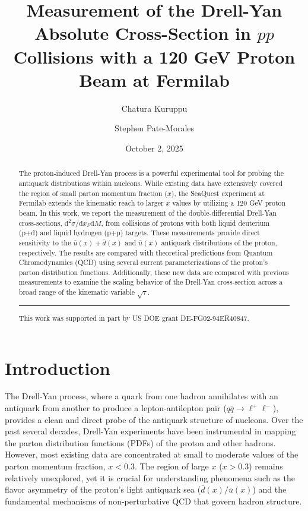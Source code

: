 \documentclass[11pt]{article}
\newcommand{\diffd}{\mathrm{d}}
\begin{document}
\linenumbers
\title{\textbf{Measurement of the Drell-Yan Absolute Cross-Section in $pp$ Collisions with a 120 GeV Proton Beam at Fermilab}}
\author[1]{Chatura Kuruppu}
\author[1]{Stephen Pate-Morales}
\date{October 2, 2025}
\maketitle

\begin{abstract}
The proton-induced Drell-Yan process is a powerful experimental tool for probing the antiquark distributions within nucleons. While existing data have extensively covered the region of small parton momentum fraction ($x$), the SeaQuest experiment at Fermilab extends the kinematic reach to larger $x$ values by utilizing a 120 GeV proton beam. In this work, we report the measurement of the double-differential Drell-Yan cross-sections, $\diffd^{2}\sigma/\diffd x_{F}\diffd M$, from collisions of protons with both liquid deuterium (p+d) and liquid hydrogen (p+p) targets. These measurements provide direct sensitivity to the $\bar{u}(x) + \bar{d}(x)$ and $\bar{u}(x)$ antiquark distributions of the proton, respectively. The results are compared with theoretical predictions from Quantum Chromodynamics (QCD) using several current parameterizations of the proton's parton distribution functions. Additionally, these new data are compared with previous measurements to examine the scaling behavior of the Drell-Yan cross-section across a broad range of the kinematic variable $\sqrt{\tau}$.
\vspace{1em}
\hrule
\vspace{1em}
\footnotesize{This work was supported in part by US DOE grant DE-FG02-94ER40847.}
\end{abstract}

\clearpage

\tableofcontents
\clearpage
\listoffigures
\clearpage
\listoftables
\clearpage


\section{Introduction}
\label{sec:introduction}
The Drell-Yan process, where a quark from one hadron annihilates with an antiquark from another to produce a lepton-antilepton pair ($q\bar{q} \rightarrow \ell^+\ell^-$), provides a clean and direct probe of the antiquark structure of nucleons. Over the past several decades, Drell-Yan experiments have been instrumental in mapping the parton distribution functions (PDFs) of the proton and other hadrons. However, most existing data are concentrated at small to moderate values of the parton momentum fraction, $x < 0.3$. The region of large $x$ ($x>0.3$) remains relatively unexplored, yet it is crucial for understanding phenomena such as the flavor asymmetry of the proton's light antiquark sea ($\bar{d}(x)/\bar{u}(x)$) and the fundamental mechanisms of non-perturbative QCD that govern hadron structure.
\end{document}
